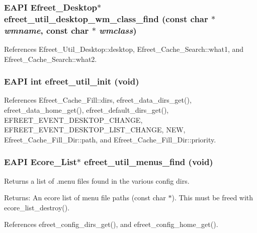 \subsubsection[efreet\_\-util\_\-desktop\_\-wm\_\-class\_\-find]{\setlength{\rightskip}{0pt plus 5cm}EAPI {\bf Efreet\_\-Desktop}$\ast$ efreet\_\-util\_\-desktop\_\-wm\_\-class\_\-find (const char $\ast$ {\em wmname}, \/  const char $\ast$ {\em wmclass})}\label{efreet__utils_8c_3ba379dbad362695a66be9e0ae6bd7df}




References Efreet\_\-Util\_\-Desktop::desktop, Efreet\_\-Cache\_\-Search::what1, and Efreet\_\-Cache\_\-Search::what2.
\subsubsection[efreet\_\-util\_\-init]{\setlength{\rightskip}{0pt plus 5cm}EAPI int efreet\_\-util\_\-init (void)}\label{efreet__utils_8c_0457c008b4cdfac5d753319d0dd65d76}




References Efreet\_\-Cache\_\-Fill::dirs, efreet\_\-data\_\-dirs\_\-get(), efreet\_\-data\_\-home\_\-get(), efreet\_\-default\_\-dirs\_\-get(), EFREET\_\-EVENT\_\-DESKTOP\_\-CHANGE, EFREET\_\-EVENT\_\-DESKTOP\_\-LIST\_\-CHANGE, NEW, Efreet\_\-Cache\_\-Fill\_\-Dir::path, and Efreet\_\-Cache\_\-Fill\_\-Dir::priority.
\subsubsection[efreet\_\-util\_\-menus\_\-find]{\setlength{\rightskip}{0pt plus 5cm}EAPI Ecore\_\-List$\ast$ efreet\_\-util\_\-menus\_\-find (void)}\label{efreet__utils_8c_adad7835d4a548070d11f093a900513d}


Returns a list of .menu files found in the various config dirs. \begin{Desc}
\item[Returns:]An ecore list of menu file paths (const char $\ast$). This must be freed with ecore\_\-list\_\-destroy(). \end{Desc}


References efreet\_\-config\_\-dirs\_\-get(), and efreet\_\-config\_\-home\_\-get().

